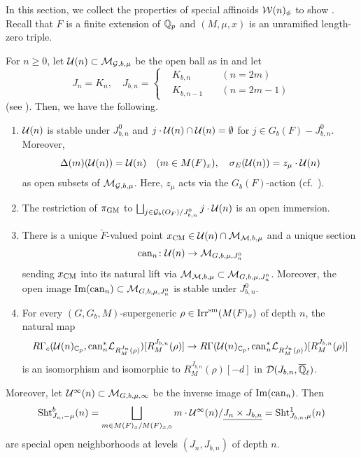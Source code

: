 \documentclass[12pt,reqno]{amsart}
\begin{document}
In this section, we collect the properties of special affinoids ${\mathcal{W}}(n)_\phi$ to show . Recall that $F$ is a finite extension of $\mathbb{Q}_p$ and $(M, \mu, x)$ is an unramified length-zero triple. 

\begin{thm} \label{thm:explicit_geometry_strongest}
    For $n \geq 0$, let ${\mathcal{U}}(n) \subset {\mathcal{M}}_{{\mathcal{G}}, b, \mu}$ be the open ball as in  and let
    \[
        J_n = K_n, \quad 
        J_{b, n} = \left\{ \begin{alignedat}{4}
            & K_{b, n} & \; & (n = 2m) \\
            & K_{b, n - 1} & \; & (n = 2m - 1)
        \end{alignedat}
        \right.
    \]
    (see ). Then, we have the following. 
    \begin{enumerate}
        \item ${\mathcal{U}}(n)$ is stable under $J^0_{b, n}$ and $j \cdot {\mathcal{U}}(n) \cap {\mathcal{U}}(n) = \emptyset$ for $j \in G_b(F) - J_{b, n}^0$. Moreover, 
        \[
            \Delta(m)({\mathcal{U}}(n)) = {\mathcal{U}}(n) \quad (m \in M(F)_x) ,\quad
            \sigma_E({\mathcal{U}}(n)) = z_\mu \cdot {\mathcal{U}}(n)
        \]
        as open subsets of ${\mathcal{M}}_{{\mathcal{G}}, b, \mu}$. Here, $z_\mu$ acts via the $G_b(F)$-action (cf.\ ). 
        \item The restriction of $\pi_{\operatorname{GM}}$ to $\bigsqcup_{j \in {\mathcal{G}}_b(O_F) / J^0_{b, n}} j \cdot {\mathcal{U}}(n)$ is an open immersion. 
        \item There is a unique $\breve{F}$-valued point $x_{\operatorname{CM}} \in {\mathcal{U}}(n) \cap {\mathcal{M}}_{{\mathcal{M}}, b, \mu}$ and a unique section
        \[
            {\operatorname{can}}_n \colon {\mathcal{U}}(n) \to {\mathcal{M}}_{G, b, \mu, J^0_n}
        \]
        sending $x_{\operatorname{CM}}$ into its natural lift via ${\mathcal{M}}_{{\mathcal{M}}, b, \mu} \subset {\mathcal{M}}_{G, b, \mu, J^0_n}$. Moreover, the open image ${\operatorname{Im}}({\operatorname{can}}_n) \subset {\mathcal{M}}_{G, b, \mu, J^0_n}$ is stable under $J_{b, n}^0$. 
        \item For every $(G, G_b, M)$-supergeneric $\rho \in {\operatorname{Irr}}^{\operatorname{sm}}(M(F)_x)$ of depth $n$, the natural map
        \begin{equation*}
            R\Gamma_c({\mathcal{U}}(n)_{\mathbb{C}_p}, {\operatorname{can}}_n^*{\mathcal{L}}_{R^{J_n}_M(\rho)})[R^{J_{b, n}}_M(\rho)] \to R\Gamma({\mathcal{U}}(n)_{\mathbb{C}_p}, {\operatorname{can}}_n^*{\mathcal{L}}_{R^{J_n}_M(\rho)})[R^{J_{b, n}}_M(\rho)]
        \end{equation*}
        is an isomorphism and isomorphic to $R^{J_{b, n}}_M(\rho)[-d]$ in ${\mathcal{D}}(J_{b, n}, {\overline{\mathbb{Q}}_\ell})$. 
    \end{enumerate}
    Moreover, let ${\mathcal{U}}^\infty(n) \subset {\mathcal{M}}_{G, b, \mu, \infty}$ be the inverse image of ${\operatorname{Im}}({\operatorname{can}}_n)$. Then
    \[
        {\operatorname{Sht}}^b_{J_n, -\mu}(n) = \bigsqcup_{m \in M(F)_x / M(F)_{x, 0}} m \cdot {\mathcal{U}}^\infty(n) / {\underline{J_n \times J_{b, n}}} = {\operatorname{Sht}}^1_{J_{b, n}, \mu}(n)
    \]
    are special open neighborhoods at levels $(J_n, J_{b, n})$ of depth $n$. 
\end{thm}
\end{document}
